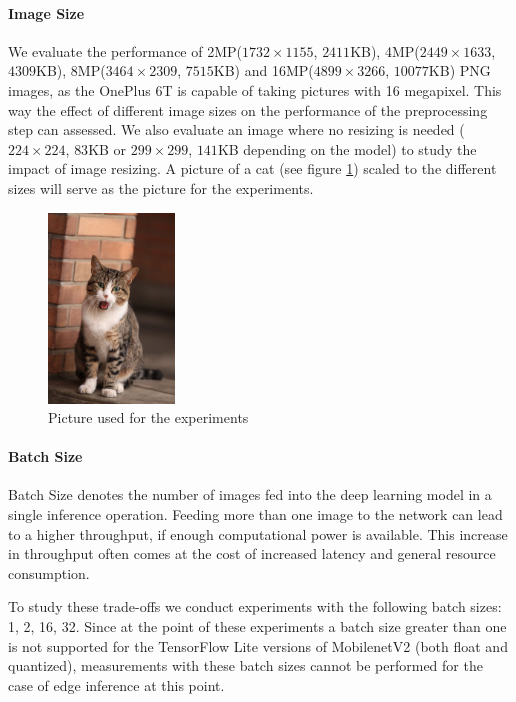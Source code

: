 \paragraph{Image Size}
We evaluate the performance of 2MP($1732\times1155$, $2411$KB), 4MP($2449\times1633$, $4309$KB), 8MP($3464\times2309$, $7515$KB) and 16MP($4899\times3266$, $10077$KB) PNG images, as the OnePlus 6T is capable of taking pictures with 16 megapixel. This way the effect of different image sizes on the performance of the preprocessing step can assessed. We also evaluate an image where no resizing is needed ($224\times224$, $83$KB or $299\times299$, $141$KB depending on the model) to study the impact of image resizing. A picture of a cat (see figure \ref{fig:cat}) scaled to the different sizes will serve as the picture for the experiments.
\begin{figure}[H]
\centering
\includegraphics[width=0.3\textwidth]{./Bilder/European_cat_compressed.jpg}
\caption{Picture used for the experiments \cite{cat}}
\label{fig:cat}
\end{figure}
\paragraph{Batch Size}
Batch Size denotes the number of images fed into the deep learning model in a single inference operation. 
Feeding more than one image to the network can lead to a higher throughput, if enough computational power is available. This increase in throughput often comes at the cost of increased latency and general resource consumption.

To study these trade-offs we conduct experiments with the following batch sizes: 1, 2, 16, 32. Since at the point of these experiments a batch size greater than one is not supported for the TensorFlow Lite versions of MobilenetV2 (both float and quantized), measurements with these batch sizes cannot be performed for the case of edge inference at this point.
